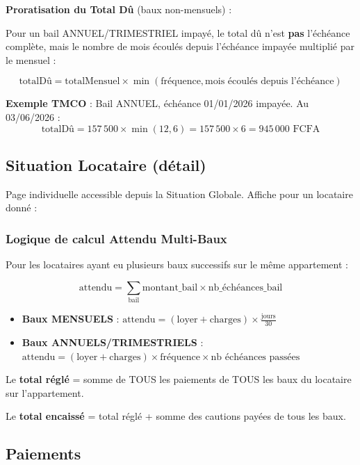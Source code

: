 \documentclass[a4paper,11pt]{article}
\begin{document}
\textbf{Proratisation du Total Dû} (baux non-mensuels) :

Pour un bail ANNUEL/TRIMESTRIEL impayé, le total dû n'est \textbf{pas} l'échéance complète, mais le nombre de mois écoulés depuis l'échéance impayée multiplié par le mensuel :

\begin{equation}
\text{totalDû} = \text{totalMensuel} \times \min(\text{fréquence}, \text{mois écoulés depuis l'échéance})
\end{equation}

\textbf{Exemple TMCO} : Bail ANNUEL, échéance 01/01/2026 impayée. Au 03/06/2026 :
$$\text{totalDû} = 157\,500 \times \min(12, 6) = 157\,500 \times 6 = 945\,000 \text{ FCFA}$$

\subsection{Situation Locataire (détail)}

Page individuelle accessible depuis la Situation Globale. Affiche pour un locataire donné :

\subsubsection{Logique de calcul Attendu Multi-Baux}
Pour les locataires ayant eu plusieurs baux successifs sur le même appartement :

\begin{equation}
\text{attendu} = \sum_{\text{bail}} \text{montant\_bail} \times \text{nb\_échéances\_bail}
\end{equation}

\begin{itemize}
  \item \textbf{Baux MENSUELS} : $\text{attendu} = (\text{loyer} + \text{charges}) \times \frac{\text{jours}}{30}$
  \item \textbf{Baux ANNUELS/TRIMESTRIELS} : $\text{attendu} = (\text{loyer} + \text{charges}) \times \text{fréquence} \times \text{nb échéances passées}$
\end{itemize}

Le \textbf{total réglé} = somme de TOUS les paiements de TOUS les baux du locataire sur l'appartement.

Le \textbf{total encaissé} = total réglé + somme des cautions payées de tous les baux.

\subsection{Paiements}
\end{document}
